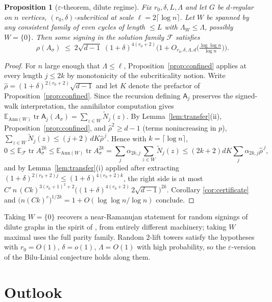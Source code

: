 \documentclass[11pt]{article}
\newtheorem{proposition}[lemma]{Proposition}
\theoremstyle{remark}
\DeclareMathOperator{\tr}{tr}
\begin{document}
\begin{proposition}[$\varepsilon$-theorem, dilute regime]\label{thm:eps}
Fix $r_0,\delta,L,\Lambda$ and let $G$ be $d$-regular on $n$
vertices, $(r_0,\delta)$-subcritical at scale
$\ell=2\lceil\log n\rceil$.
Let $W$ be spanned by any consistent family of even cycles of length
$\le L$ with $\Lambda_W\le\Lambda$, possibly $W=\{0\}$. Then some
signing in the solution family $\mathcal F$ satisfies
\[
\rho(A_\sigma)\;\le\;
2\sqrt{d-1}\;(1+\delta)^{4(r_0+2)}
\Big(1+O_{r_0,\delta,\Lambda,d}\big(\tfrac{\log\log n}{\log n}\big)\Big).
\]
\end{proposition}

\begin{proof}
For $n$ large enough that $\Lambda\le\ell$,
Proposition~\ref{prop:confined} applies at every length $j\le2k$ by
monotonicity of the subcriticality notion. Write
$\hat\rho=(1+\delta)^{2(r_0+2)}\sqrt{d-1}$ and let $K$ denote
the prefactor of Proposition~\ref{prop:confined}. Since the recursion
defining $\mathsf A_j$ preserves the signed-walk interpretation, the
annihilator computation gives
$\mathbb E_{\mathrm{Ann}(W)}\tr\mathsf A_j(A_\sigma)
=\sum_{z\in W}\widetilde N_j(z)$. By
Lemma~\ref{lem:transfer}(ii), Proposition~\ref{prop:confined}, and
$\hat\rho^2\ge d-1$ (terms nonincreasing in $p$),
$\sum_{z\in W}\widetilde N_j(z)\le(j+2)\,dK\hat\rho^{\,j}$. Hence with
$k=\lceil\log n\rceil$,
\[
0\le\mathbb E_{\mathcal F}\tr A_\sigma^{2k}
\le\mathbb E_{\mathrm{Ann}(W)}\tr A_\sigma^{2k}
=\sum_j\alpha_{2k,j}\sum_{z\in W}\widetilde N_j(z)
\le (2k+2)dK\sum_j\alpha_{2k,j}\hat\rho^{\,j},
\]
and by Lemma~\ref{lem:transfer}(i) applied after extracting
$(1+\delta)^{2(r_0+2)j}\le(1+\delta)^{4(r_0+2)k}$, the right side is at
most $C'\,n\,(Ck)^{3(r_0+1)^2+2}
\big((1+\delta)^{4(r_0+2)}\,2\sqrt{d-1}\big)^{2k}$. Corollary
\ref{cor:certificate} and $\big(n(Ck)^{c}\big)^{1/2k}
=1+O(\log\log n/\log n)$ conclude.
\end{proof}

Taking $W=\{0\}$ recovers a near-Ramanujan statement for random
signings of dilute graphs in the spirit of \cite{mop20}, from entirely
different machinery; taking $W$ maximal uses the full parity family.
Random $2$-lift towers satisfy the hypotheses with $r_0=O(1)$,
$\delta=o(1)$, $\Lambda=O(1)$ with high probability, so the
$\varepsilon$-version of the Bilu-Linial conjecture holds along them.

\section{Outlook}
\end{document}
